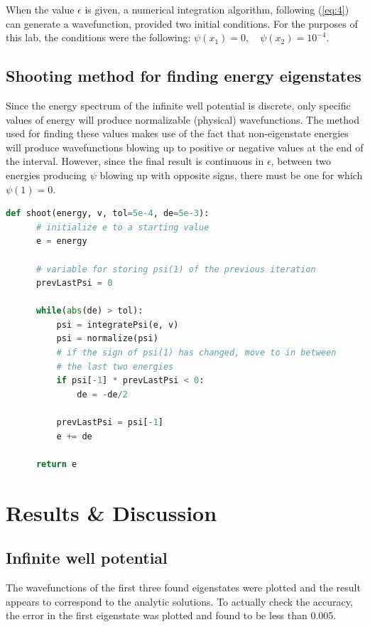 \documentclass[11pt]{article}
\begin{document}
When the value $\epsilon$ is given, a numerical integration algorithm, following
(\ref{eq:4}) can 
generate a wavefunction, provided two initial conditions.
For the purposes of this lab, the conditions were the following:
$\psi(x_1)=0,\quad \psi(x_2)=10^{-4}$.

\subsection{Shooting method for finding energy eigenstates}

Since the energy spectrum of the infinite well potential is discrete, only specific
values of energy will produce normalizable (physical) wavefunctions. 
The method used for finding these values makes use of the fact that non-eigenstate
energies will produce wavefunctions blowing up to positive or negative
values at the end of the interval.
However, since the final result is continuous in $\epsilon$, 
between two energies producing $\psi$ blowing
up with opposite signs, there must be one for which $\psi(1)=0$.

\begin{lstlisting}[language=Python, style=myStyle]
  def shoot(energy, v, tol=5e-4, de=5e-3):
      # initialize e to a starting value
      e = energy

      # variable for storing psi(1) of the previous iteration
      prevLastPsi = 0

      while(abs(de) > tol):
          psi = integratePsi(e, v)
          psi = normalize(psi)
          # if the sign of psi(1) has changed, move to in between 
          # the last two energies
          if psi[-1] * prevLastPsi < 0:
              de = -de/2

          prevLastPsi = psi[-1]
          e += de

      return e
\end{lstlisting}

\section{Results \& Discussion}
\vspace{-.4cm}
\subsection{Infinite well potential}

The wavefunctions of the first three found eigenstates were plotted and
the result appears to correspond to the analytic solutions. To actually
check the accuracy, the error in the first eigenstate was plotted and found to
be less than 0.005.
\end{document}
